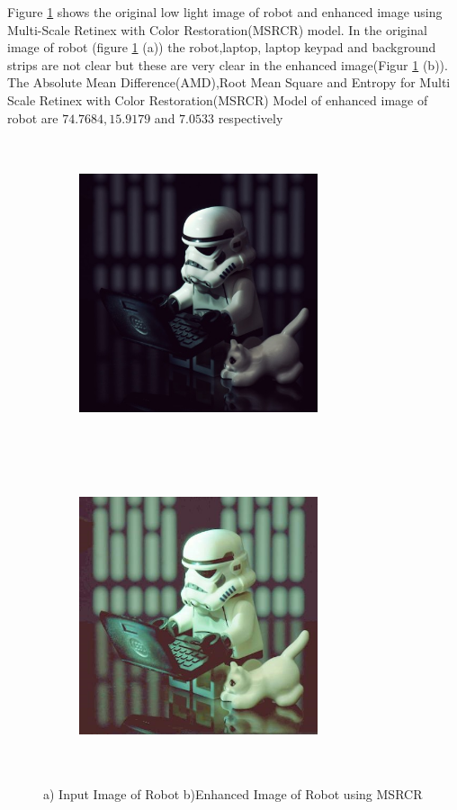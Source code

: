 Figure \ref{fig:msrcrRobot} shows the original low light image of robot and enhanced image using Multi-Scale Retinex with Color Restoration(MSRCR) model. In the original image of robot (figure \ref{fig:msrcrRobot} (a))  the robot,laptop, laptop keypad and background strips are not clear but these are very clear in the enhanced image(Figur \ref{fig:msrcrRobot} (b)). The Absolute Mean Difference(AMD),Root Mean Square and Entropy for Multi Scale Retinex with Color Restoration(MSRCR) Model of enhanced image of robot are $74.7684, 15.9179$ and $7.0533$ respectively      

\begin{figure}[!htb]
	\begin{subfigure}{8cm}
		\centering    
    	\includegraphics[width=7cm,height=9cm,keepaspectratio]{images/ch5/robot_input.jpg}
    	\caption{} 
    \end{subfigure}
  	\begin{subfigure}{6cm}
  		\centering
  		\includegraphics[width=7cm,height=9cm,keepaspectratio]{images/ch5/robot_msrcr.jpg}
   		\caption{}
  	\end{subfigure}
  	\caption{a) Input Image of Robot b)Enhanced Image of Robot using MSRCR}
  	\label{fig:msrcrRobot}
\end{figure}


